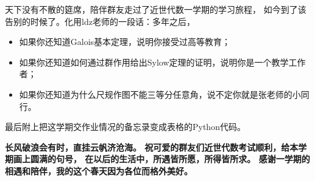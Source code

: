\documentclass[12pt, a4paper, fontset=windows]{ctexart}
\begin{document}
天下没有不散的筵席，陪伴群友走过了近世代数一学期的学习旅程，
如今到了该告别的时候了。化用ldz老师的一段话：多年之后，
\begin{itemize}[itemsep=0pt]
\item 如果你还知道Galois基本定理，说明你接受过高等教育；
\item 如果你还知道如何通过群作用给出Sylow定理的证明，说明你是一个教学工作者；
\item 如果你还知道为什么尺规作图不能三等分任意角，说不定你就是张老师的小同行。
\end{itemize}

最后附上把这学期交作业情况的备忘录变成表格的Python代码。



\vspace{1em}

{\bf\large 长风破浪会有时，直挂云帆济沧海。
祝可爱的群友们近世代数考试顺利，给本学期画上圆满的句号，
在以后的生活中，所遇皆所愿，所得皆所求。
感谢一学期的相遇和陪伴，我的这个春天因为各位而格外美好。}

\clearpage
\part*{}
\def\refname{\LARGE 参考文献}
\centering
\end{document}
